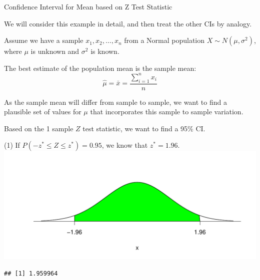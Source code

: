 \documentclass[t,xcolor=pdftex,dvipsnames,table]{beamer}\usepackage[]{graphicx}\usepackage[]{color}
\makeatletter
\def\maxwidth{ %
  \ifdim\Gin@nat@width>\linewidth
    \linewidth
  \else
    \Gin@nat@width
  \fi
}
\newenvironment{kframe}{%
 \def\at@end@of@kframe{}%
 \ifinner\ifhmode%
  \def\at@end@of@kframe{\end{minipage}}%
  \begin{minipage}{\columnwidth}%
 \fi\fi%
 \def\FrameCommand##1{\hskip\@totalleftmargin \hskip-\fboxsep
 \colorbox{shadecolor}{##1}\hskip-\fboxsep
     \hskip-\linewidth \hskip-\@totalleftmargin \hskip\columnwidth}%
 \MakeFramed {\advance\hsize-\width
   \@totalleftmargin\z@ \linewidth\hsize
   \@setminipage}}%
 {\par\unskip\endMakeFramed%
 \at@end@of@kframe}
\newenvironment{knitrout}{}{} %
\makeatother
\begin{document}
\begin{frame}[fragile]{Confidence Interval for Mean based on Z Test Statistic}

We will consider this example in detail, and then treat the other CIs by analogy.

\vspace{.5cm}
Assume we have a sample $x_{1}, x_{2}, \ldots, x_{n}$ from a Normal population $X \sim N(\mu, \sigma^2)$, where $\mu$ is unknown and $\sigma^2$ is known.

\vspace{.5cm}
The best estimate of the population mean is the sample mean:
\[ \hat{\mu} = \bar{x} = \frac{\sum_{i=1}^n x_{i}}{n} \]

\vspace{.5cm}
As the sample mean will differ from sample to sample, we want to find a plausible set of values for $\mu$ that incorporates this sample to sample variation.

\end{frame}

\begin{frame}[fragile]{}

Based on the 1 sample $Z$ test statistic, we want to find a 95\% CI. 

\vspace{.5cm}
(1) If $P(-z^{*} \leq Z \leq z^{*}) = 0.95$, we know that $z^{*} = 1.96$. \\


\begin{knitrout}
\color{fgcolor}
\includegraphics[width=\maxwidth]{figure/unnamed-chunk-178-1} 
\begin{kframe}\begin{verbatim}
## [1] 1.959964
\end{verbatim}
\end{kframe}
\end{knitrout}
\end{frame}
\end{document}
